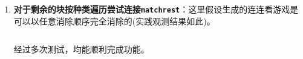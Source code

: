 \documentclass{article}
\numberwithin{figure}{section}
\numberwithin{table}{section}
\numberwithin{listing}{section}
\numberwithin{equation}{section}
\begin{document}
\begin{enumerate}
\begin{enumerate}
                    \item \textbf{对于剩余的块按种类遍历尝试连接\texttt{matchrest}}：这里假设生成的连连看游戏是可以以任意消除顺序完全消除的(实践观测结果如此)。

                        \inputminted[firstline=138,lastline=164]{matlab}{../linkgame/omg.m}
                        \begingroup
                        \endgroup

                        经过多次测试，均能顺利完成功能。

                \end{enumerate}

        \end{enumerate}

\end{document}
